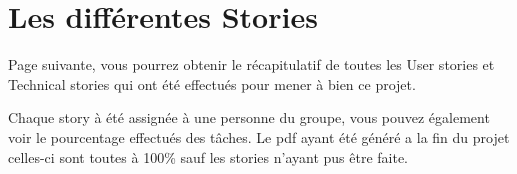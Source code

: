 \chapter{Les différentes Stories}\label{tableauTaches}
Page suivante, vous pourrez obtenir le récapitulatif de toutes les User stories et Technical stories qui ont été effectués pour mener à bien ce projet.

Chaque story à été assignée à une personne du groupe, vous pouvez également voir le pourcentage effectués des tâches. Le pdf ayant été généré a la fin du projet celles-ci sont toutes à 100\% sauf les stories n'ayant pus être faite.


